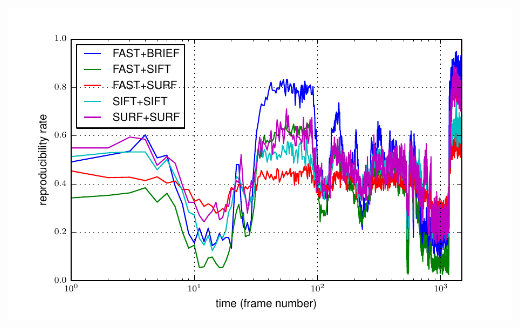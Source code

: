 \documentclass[11pt]{article} %
\theoremstyle{plain}
\theoremstyle{definition}
\theoremstyle{remark}
\numberwithin{equation}{section} %
\numberwithin{figure}{section} %
\numberwithin{table}{section} %
\begin{document}
\includegraphics{../figures/reproducibility.pdf}



\end{document}
